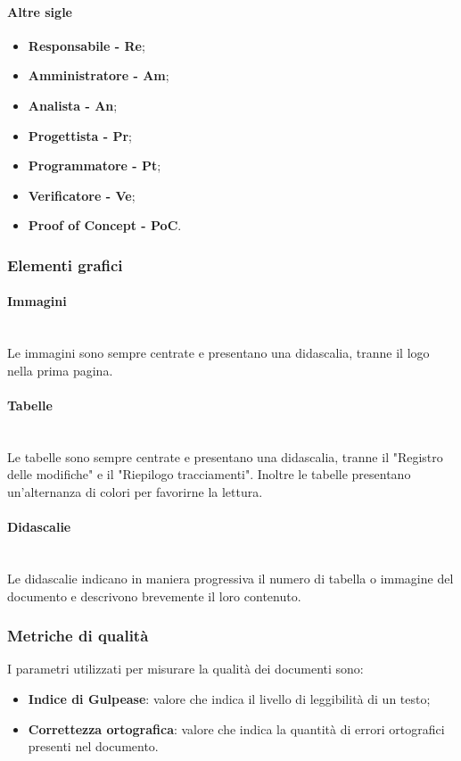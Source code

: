                 \paragraph{Altre sigle}
                    \begin{itemize}
                        \item \textbf{Responsabile - Re};
                        \item \textbf{Amministratore - Am};
                        \item \textbf{Analista - An};
                        \item \textbf{Progettista - Pr};
                        \item \textbf{Programmatore - Pt};
                        \item \textbf{Verificatore - Ve};
                        \item \textbf{Proof of Concept - PoC\glo}.
                    \end{itemize}
            \subsubsection{Elementi grafici}
                \paragraph{Immagini}\mbox{}\\ [1mm]
                    Le immagini sono sempre centrate e presentano una didascalia, tranne il logo nella prima pagina.
                \paragraph{Tabelle}\mbox{}\\ [1mm]
                    Le tabelle sono sempre centrate e presentano una didascalia, tranne il "Registro delle modifiche" e il "Riepilogo tracciamenti".
                    Inoltre le tabelle presentano un'alternanza di colori per favorirne la lettura.
                \paragraph{Didascalie}\mbox{}\\ [1mm]
                    Le didascalie indicano in maniera progressiva il numero di tabella o immagine del documento e descrivono brevemente il loro contenuto.
            \subsubsection{Metriche di qualità}
           		I parametri utilizzati per misurare la qualità dei documenti sono:
                \begin{itemize}
                	\item \textbf{Indice di Gulpease}: valore che indica il livello di leggibilità di un testo;
                	\item \textbf{Correttezza ortografica}: valore che indica la quantità di errori ortografici presenti nel documento.
                \end{itemize}                        
